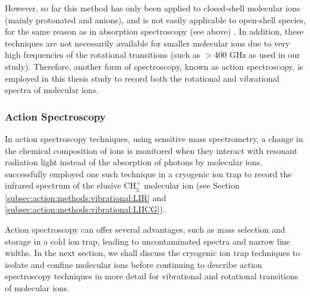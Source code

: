 However, so far this method has only been applied to closed-shell molecular ions (mainly protonated and anions), and is not easily applicable to open-shell species, for the same reason as in absorption spectroscopy (see above) \cite{gottlieb_rotational_2000, mccarthy_laboratory_2006, mccarthy_laboratory_2015}. In addition, these techniques are not necessarily available for smaller molecular ions due to very high frequencies of the rotational transitions (such as $>400$ GHz as used in our study).
Therefore, another form of spectroscopy, known as action spectroscopy, is employed in this thesis study to record both the rotational and vibrational spectra of molecular ions.

\subsubsection*{Action Spectroscopy}

In action spectroscopy techniques, using sensitive mass spectrometry, a change in the chemical composition of ions is monitored when they interact with resonant radiation light instead of the absorption of photons by molecular ions.
\citet{asvany_understanding_2005} successfully employed one such technique in a
cryogenic ion trap to record the infrared spectrum of the elusive CH$_5^+$
molecular ion (see Section \ref{subsec:action:methods:vibrational:LIR} and
\ref{subsec:action:methods:vibrational:LIICG}).

Action spectroscopy can offer several advantages, such as mass selection and
storage in a cold ion trap, leading to uncontaminated spectra and narrow line
widths. In the next section, we shall discuss the cryogenic ion trap techniques
to isolate and confine molecular ions before continuing to describe action spectroscopy
techniques in more detail for vibrational and rotational transitions of molecular ions.

